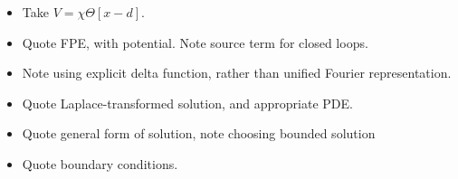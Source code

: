 \begin{itemize}
  \item {Take $V=\chi\Theta[x-d]$.}
  \item Quote FPE, with potential.  Note source term for closed loops.  
  \item Note using explicit delta function, rather than unified Fourier representation.  
  \item Quote Laplace-transformed solution, and appropriate PDE. 
  \item Quote general form of solution, note choosing bounded solution
  \item Quote boundary conditions.  
    

\end{itemize}
